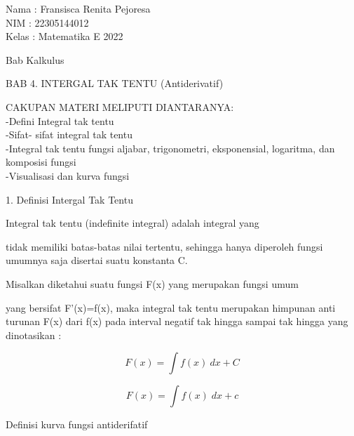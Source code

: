 \documentclass[a4paper,10pt]{article}
\begin{document}
\begin{eulernotebook}
\begin{eulercomment}
Nama  : Fransisca Renita Pejoresa\\
NIM   : 22305144012\\
Kelas : Matematika E 2022\\
\end{eulercomment}
\eulersubheading{}
\begin{eulercomment}
Bab Kalkulus\\
\end{eulercomment}
\eulersubheading{}
\begin{eulercomment}
BAB 4. INTERGAL TAK TENTU (Antiderivatif)

\end{eulercomment}
\eulersubheading{}
\begin{eulercomment}
CAKUPAN MATERI MELIPUTI DIANTARANYA:\\
-Defini Integral tak tentu\\
-Sifat- sifat integral tak tentu\\
-Integral tak tentu fungsi aljabar, trigonometri, eksponensial,
logaritma, dan komposisi fungsi\\
-Visualisasi dan kurva fungsi

1. Definisi Intergal Tak Tentu

\end{eulercomment}
\begin{eulerttcomment}
    Integral tak tentu (indefinite integral) adalah integral yang
\end{eulerttcomment}
\begin{eulercomment}
tidak memiliki batas-batas nilai tertentu, sehingga hanya diperoleh
fungsi umumnya saja disertai suatu konstanta C.

\end{eulercomment}
\begin{eulerttcomment}
    Misalkan diketahui suatu fungsi F(x) yang merupakan fungsi umum
\end{eulerttcomment}
\begin{eulercomment}
yang bersifat F'(x)=f(x), maka integral tak tentu merupakan himpunan
anti turunan F(x) dari f(x) pada interval negatif tak hingga sampai
tak hingga yang dinotasikan :

\end{eulercomment}
\begin{eulerformula}
\[
 F(x) = \int f(x)\ dx + C
\]
\end{eulerformula}
\begin{eulerformula}
\[
F\left(x\right)=\int {f\left(x\right)}{\;dx}+c
\]
\end{eulerformula}
\begin{eulercomment}
Definisi kurva fungsi antiderifatif


\end{eulercomment}
\end{eulernotebook}
\end{document}
